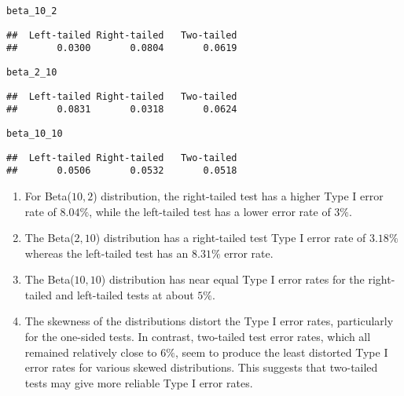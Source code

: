 \documentclass{article}\usepackage[]{graphicx}\usepackage[]{xcolor}
\makeatletter
\newcommand{\hldef}[1]{\textcolor[rgb]{0.345,0.345,0.345}{#1}}%
\newenvironment{kframe}{%
 \def\at@end@of@kframe{}%
 \ifinner\ifhmode%
  \def\at@end@of@kframe{\end{minipage}}%
  \begin{minipage}{\columnwidth}%
 \fi\fi%
 \def\FrameCommand##1{\hskip\@totalleftmargin \hskip-\fboxsep
 \colorbox{shadecolor}{##1}\hskip-\fboxsep
     \hskip-\linewidth \hskip-\@totalleftmargin \hskip\columnwidth}%
 \MakeFramed {\advance\hsize-\width
   \@totalleftmargin\z@ \linewidth\hsize
   \@setminipage}}%
 {\par\unskip\endMakeFramed%
 \at@end@of@kframe}
\newenvironment{knitrout}{}{} %
\makeatother
\begin{document}
\begin{enumerate}
\begin{knitrout}
\begin{kframe}
\begin{alltt}
\hldef{beta_10_2}
\end{alltt}
\begin{verbatim}
##  Left-tailed Right-tailed   Two-tailed 
##       0.0300       0.0804       0.0619
\end{verbatim}
\begin{alltt}
\hldef{beta_2_10}
\end{alltt}
\begin{verbatim}
##  Left-tailed Right-tailed   Two-tailed 
##       0.0831       0.0318       0.0624
\end{verbatim}
\begin{alltt}
\hldef{beta_10_10}
\end{alltt}
\begin{verbatim}
##  Left-tailed Right-tailed   Two-tailed 
##       0.0506       0.0532       0.0518
\end{verbatim}
\end{kframe}
\end{knitrout}
\begin{enumerate}
  \item For Beta($10, 2$) distribution, the right-tailed test has a higher Type I error rate of $8.04\%$, while the left-tailed test has a lower error rate of $3\%$.
  \item The Beta($2, 10$) distribution has a right-tailed test Type I error rate of $3.18\%$ whereas the left-tailed test has an $8.31\%$ error rate.
  \item The Beta($10, 10$) distribution has near equal Type I error rates for the right-tailed and left-tailed tests at about $5\%$.
  \item The skewness of the distributions distort the Type I error rates, particularly for the one-sided tests. In contrast, two-tailed test error rates, which all remained relatively close to $6\%$, seem to produce the least distorted Type I error rates for various skewed distributions. This suggests that two-tailed tests may give more reliable Type I error rates. 
\end{enumerate}


\end{enumerate}

\end{document}
